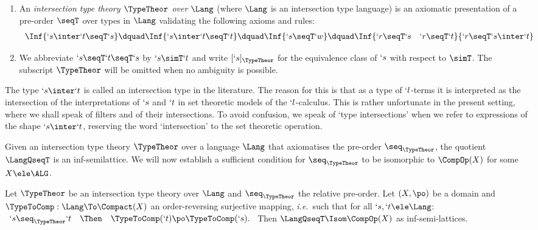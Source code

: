 \documentclass{lmcs}
\def\ie{\emph{i.e.}}
\begin{document}
 \begin{defi} \label{def:interLangTheory}

 \begin{enumerate}

 \firstitem 
A denumerable set of type expressions $\Lang$ is called an \emph{intersection type language} if there exists a constant $`w \ele \Lang$ and $\Lang$ is closed under the binary operator $`s\inter`t $, called \emph{type intersection}.

 \item 
An \emph{intersection type theory $\TypeTheor$ over $\Lang$} (where $\Lang$ is an intersection type language) is an axiomatic presentation of a pre-order $\seqT$ over %
types in $\Lang$ validating the following axioms and rules:
%
 \[ \begin{array}{c@{\dquad}c@{\dquad}c@{\dquad}c}
	\Inf {`s \inter `t \seqT `s } &
	\Inf {`s \inter `t \seqT `t } &
	\Inf {`s \seqT `w } &
	\Inf {`r \seqT `s \quad `r \seqT `t }{ `r \seqT `s \inter `t }
	\end{array} \]

 \item
We abbreviate $`s\seqT`t\seqT`s$ by $`s \simT`t$ and write $[`s]_{\TypeTheor}$ for the equivalence class of $`s$ with respect to $\simT$. The subscript ${\TypeTheor}$ will be omitted when no ambiguity is possible.

 \end{enumerate}
 \end{defi}

The type $`s\inter`t$ is called an intersection type in the literature. 
The reason for this is that as a type of $`l$-terms it is interpreted as the intersection of the interpretations of $`s$ and $`t$ in set theoretic models of the $`l$-calculus. 
This is rather unfortunate in the present setting, where we shall speak of filters and of their intersections. 
To avoid confusion, we speak of `type intersections' when we refer to expressions of the shape $`s\inter`t$, reserving the word `intersection' to the set theoretic operation.

Given an intersection type theory $\TypeTheor$ over a language $\Lang$ that axiomatises the pre-order $\seq_{\TypeTheor}$, the quotient $\LangQseqT$ is an inf-semilattice. 
We will now establish a sufficient condition for $\seq_{\TypeTheor}$ to be isomorphic to $\CompOp(X)$ for some $X \ele \ALG$.

 \begin{lem} \label{lem:compactRep}
Let $ \TypeTheor$ be an intersection type theory over $\Lang$ and $\seq_{\TypeTheor}$ the relative pre-order. 
Let $(X,\po)$ be a domain and $ \TypeToComp: \Lang \To \Compact(X) $ an order-reversing surjective mapping, \ie~such that for all $`s,`t \ele \Lang$:
%
 $ \begin{array}{rcl}
`s \seq_{\TypeTheor} `t &\Then& \TypeToComp(`t) \po \TypeToComp(`s). 
 \end{array} $
Then $\LangQseqT \Isom \CompOp(X)$ as inf-semi-lattices.
 \end{lem}
\end{document}

